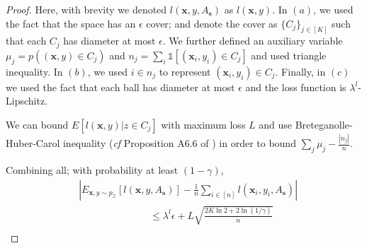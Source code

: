 \documentclass{article}
\begin{document}
\begin{proof}
Here, with brevity we denoted $l(\mathbf{x},y, A_\mathbf{s})$ as $l(\mathbf{x},y)$. In $(a)$, we used the fact that the space has an $\epsilon$ cover; and denote the cover as $\{C_j\}_{j \in [K]}$ such that each $C_j$ has diameter at most $\epsilon$. We further defined an auxiliary variable $\mu_j=p((\mathbf{x},y) \in C_j)$ and $n_j = \sum_i \mathds{1}[(\mathbf{x}_i,y_i) \in C_j]$ and used triangle inequality. In $(b)$, we used $i \in n_j$ to represent $(\mathbf{x}_i,y_i) \in C_j$. Finally, in $(c)$ we used the fact that each ball has diameter at most $\epsilon$ and the loss function is $\lambda^l$-Lipschitz. 

We can bound $E[l(\mathbf{x},y)|z \in C_j]$ with maximum loss $L$ and use Breteganolle-Huber-Carol inequality (\emph{cf} Proposition A6.6 of \cite{wellner}) in order to bound $\sum_{j} \mu_{j} -   \frac{|n_j|}{n}$. 

Combining all; with probability at least $(1-\gamma)$,
\[
\begin{aligned}
&\left|E_{\mathbf{x},y \sim p_\mathcal{Z}}[l(\mathbf{x},y, A_\mathbf{s})] - \frac{1}{n}\sum_{i \in [n]} l(\mathbf{x}_i,y_i,A_\mathbf{s})\right| \\
 &\hspace{3cm}\leq  \lambda^l \epsilon + L \sqrt{\frac{2K\ln 2 + 2\ln (1/\gamma)}{n}}\\
\end{aligned}
\]
\end{proof}
\end{document}
